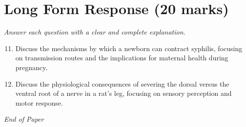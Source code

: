 \documentclass[12pt]{article}
\begin{document}
\section*{Long Form Response (20 marks)}
\textit{Answer each question with a clear and complete explanation.}
\begin{enumerate}[label=\arabic*.]
\setcounter{enumi}{10}
\item Discuss the mechanisms by which a newborn can contract syphilis, focusing on transmission routes and the implications for maternal health during pregnancy.
\item Discuss the physiological consequences of severing the dorsal versus the ventral root of a nerve in a rat's leg, focusing on sensory perception and motor response.
\end{enumerate}

\vfill
\noindent\textit{End of Paper}
\end{document}

